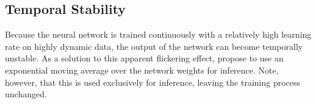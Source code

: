 \subsection{Temporal Stability}
Because the neural network is trained continuously with a relatively high learning rate on highly dynamic data, the output of the network can become temporally unstable.
As a solution to this apparent flickering effect, \textcite{muller2021} propose to use an exponential moving average over the network weights for inference.
Note, however, that this is used exclusively for inference, leaving the training process unchanged.